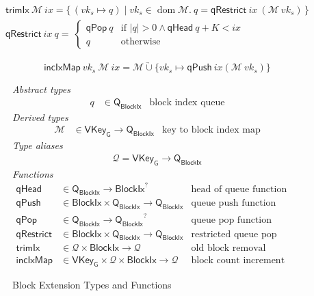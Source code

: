 \documentclass[11pt,a4paper]{article}
\DeclareMathOperator{\dom}{dom}
\newcommand\Set[2]{\{\,#1\mid#2\,\}}
\newcommand{\unionoverride}{\mathbin{\underrightarrow\cup}}
\newcommand{\fun}[1]{\mathsf{#1}}
\newcommand{\type}[1]{\mathsf{#1}}
\newcommand{\size}[1]{\left| #1 \right|}
\newcommand{\BlockIx}{\type{BlockIx}}
\newcommand{\Queue}{\type{Q}}
\newcommand{\VKeyGen}{\type{VKey_G}}
\newcommand{\signmapname}{\mathcal{M}}
\newcommand{\trimixname}{trimIx}
\newcommand{\incixmapname}{incIxMap}
\newcommand{\qrestrname}{qRestrict}
\newcommand{\qpopname}{qPop}
\newcommand{\qheadname}{qHead}
\newcommand{\qpushname}{qPush}
\newcommand{\signmap}[1]{\fun{\signmapname} ~ #1}
\newcommand{\qrestr}[2]{\fun{\qrestrname} ~ #1 ~ #2}
\newcommand{\trimix}[2]{\fun{\trimixname} ~ #1 ~ #2}
\newcommand{\incixmap}[3]{\fun{\incixmapname} ~ #1 ~ #2 ~ #3}
\newcommand{\qpop}[1]{\fun{\qpopname} ~ #1}
\newcommand{\qhead}[1]{\fun{\qheadname} ~ #1}
\newcommand{\qpush}[1]{\fun{\qpushname} ~ #1}
\newcommand{\totalf}{\to}
\newcommand{\partialf}{\mapsto}
\newcommand{\mapqueue}{\mathcal{Q}}
\begin{document}
\begin{align}
  \label{eq:trimix}
  \trimix{\signmapname}{ix} = \Set{(vk_s \partialf q)}{vk_s \in \dom \signmapname.~
  q = \qrestr{ix}{(\signmap{vk_s}})} \\
  \qrestr{ix}{q} = \
  \begin{cases}
    \qpop{q} & \text{if } \size{q} > 0 \wedge \qhead{q} + K < ix \\
    q & \text{otherwise}
  \end{cases}
\end{align}

\begin{equation}
  \label{eq:incixmap}
  \incixmap{vk_s}{\signmapname}{ix} = \signmapname \unionoverride \{vk_s \partialf \qpush{ix}{(\signmap{vk_s})}\}
\end{equation}


\begin{figure}
  \emph{Abstract types}
  \begin{align*}
    q & \in \Queue_\BlockIx  & \text{block index queue}
  \end{align*}
  \emph{Derived types}
  \begin{align*}
    \signmapname & \in \VKeyGen \totalf \Queue_\BlockIx & \text{key to block index map}
  \end{align*}
  \emph{Type aliases}
  \begin{align*}
    \mapqueue = \VKeyGen \totalf \Queue_\BlockIx
  \end{align*}
  \emph{Functions}
  \begin{align*}
    \fun{\qheadname} & \in \Queue_\BlockIx \totalf \BlockIx^? & \text{head of queue function} \\
    \fun{\qpushname} & \in \BlockIx \times \Queue_\BlockIx \totalf \Queue_\BlockIx
      & \text{queue push function} \\
    \fun{\qpopname} & \in \Queue_\BlockIx \totalf {\Queue_\BlockIx}^?
      & \text{queue pop function} \\
    \fun{\qrestrname} & \in \BlockIx \times \Queue_\BlockIx \totalf \Queue_\BlockIx
      & \text{restricted queue pop function} \\
    \fun{\trimixname} & \in \mapqueue \times \BlockIx \totalf \mapqueue
      & \text{old block removal function} \\
    \fun{\incixmapname} & \in \VKeyGen \times \mapqueue \times \BlockIx \totalf \mapqueue
      & \text{block count increment function}
  \end{align*}
  \caption{Block Extension Types and Functions}
  \label{fig:block-ext-types-funs}
\end{figure}
\end{document}
